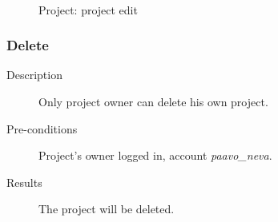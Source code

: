 \begin{figure}[bth]
\myfloatalign
{} \quad
{} \\
\caption[Project: project edit]{Project:  project edit}
\label{fig:user_guide:project:project_edit}
\end{figure}

\clearpage

\subsubsection{Delete}
\label{ch:appendix-a:user_guide:project:delete}

\begin{description}
\item[Description] Only project owner can delete his own project.
\item[Pre-conditions] Project's owner logged in, \eg account \emph{paavo\_neva}.
\item[Results] The project will be deleted.
\end{description}

